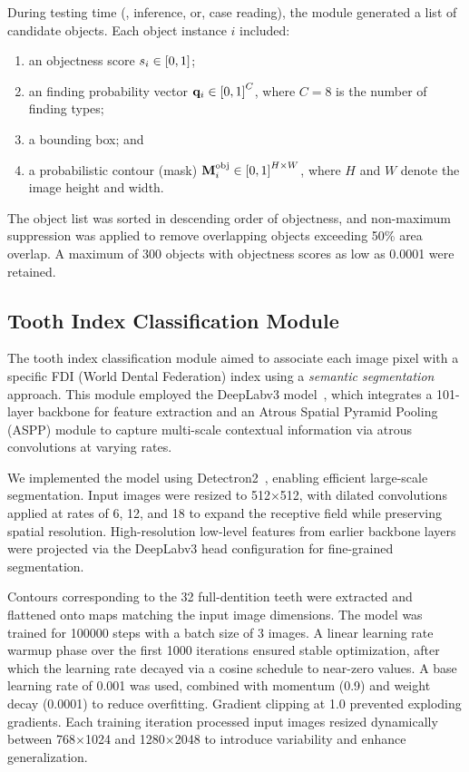 During testing time (\ie, inference, or, case reading), the module generated a list of candidate objects. Each object instance $i$ included:
\begin{enumerate}
    \item an objectness score $s_i\in{\left[0, 1\right]}$;
    \item an finding probability vector $\mathbf{q}_i\in{\left[0, 1\right]}^C$, where $C=8$ is the number of finding types;
    \item a bounding box; and
    \item a probabilistic contour (mask) $\mathbf{M}^\mathrm{obj}_i\in{\left[0, 1\right]}^{H \times W}$, where $H$ and $W$ denote the image height and width. 
\end{enumerate}

The object list was sorted in descending order of objectness, and non-maximum suppression was applied to remove overlapping objects exceeding 50\% area overlap.
A maximum of \num{300} objects with objectness scores as low as \num{0.0001} were retained.

\subsection{Tooth Index Classification Module}
The tooth index classification module aimed to associate each image pixel with a specific FDI (World Dental Federation) index using a \emph{semantic segmentation} approach.
This module employed the DeepLabv3 model~\citep{chen2017rethinking}, which integrates a 101-layer backbone for feature extraction and an Atrous Spatial Pyramid Pooling (ASPP) module to capture multi-scale contextual information via atrous convolutions at varying rates.

We implemented the model using Detectron2~\citep{wu2019detectron2}, enabling efficient large-scale segmentation.
Input images were resized to 512×512, with dilated convolutions applied at rates of 6, 12, and 18 to expand the receptive field while preserving spatial resolution.
High-resolution low-level features from earlier backbone layers were projected via the DeepLabv3 head configuration for fine-grained segmentation.

Contours corresponding to the 32 full-dentition teeth were extracted and flattened onto maps matching the input image dimensions.
The model was trained for \num{100000} steps with a batch size of 3 images.
A linear learning rate warmup phase over the first \num{1000} iterations ensured stable optimization, after which the learning rate decayed via a cosine schedule to near-zero values.
A base learning rate of \num{0.001} was used, combined with momentum (0.9) and weight decay (\num{0.0001}) to reduce overfitting.
Gradient clipping at 1.0 prevented exploding gradients.
Each training iteration processed input images resized dynamically between 768×1024 and 1280×2048 to introduce variability and enhance generalization.

